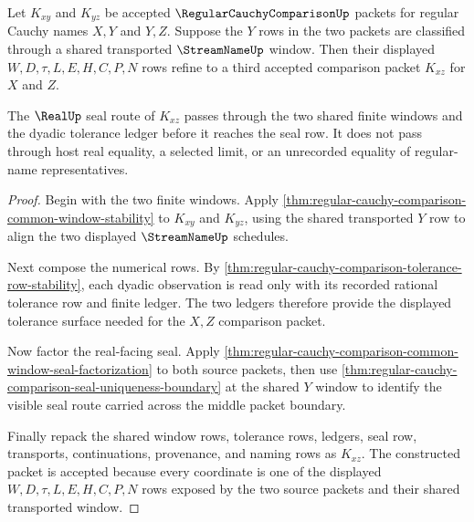 \begin{theorem}
\label{thm:regular-cauchy-comparison-three-window-triangle}
Let $K_{xy}$ and $K_{yz}$ be accepted $\RegularCauchyComparisonUp$ packets for regular Cauchy names $X,Y$ and $Y,Z$. Suppose the $Y$ rows in the two packets are classified through a shared transported $\StreamNameUp$ window. Then their displayed $W,D,\tau,L,E,H,C,P,N$ rows refine to a third accepted comparison packet $K_{xz}$ for $X$ and $Z$.

The $\RealUp$ seal route of $K_{xz}$ passes through the two shared finite windows and the dyadic tolerance ledger before it reaches the seal row. It does not pass through host real equality, a selected limit, or an unrecorded equality of regular-name representatives.
\end{theorem}
\begin{proof}
Begin with the two finite windows. Apply \autoref{thm:regular-cauchy-comparison-common-window-stability} to $K_{xy}$ and $K_{yz}$, using the shared transported $Y$ row to align the two displayed $\StreamNameUp$ schedules.

Next compose the numerical rows. By \autoref{thm:regular-cauchy-comparison-tolerance-row-stability}, each dyadic observation is read only with its recorded rational tolerance row and finite ledger. The two ledgers therefore provide the displayed tolerance surface needed for the $X,Z$ comparison packet.

Now factor the real-facing seal. Apply \autoref{thm:regular-cauchy-comparison-common-window-seal-factorization} to both source packets, then use \autoref{thm:regular-cauchy-comparison-seal-uniqueness-boundary} at the shared $Y$ window to identify the visible seal route carried across the middle packet boundary.

Finally repack the shared window rows, tolerance rows, ledgers, seal row, transports, continuations, provenance, and naming rows as $K_{xz}$. The constructed packet is accepted because every coordinate is one of the displayed $W,D,\tau,L,E,H,C,P,N$ rows exposed by the two source packets and their shared transported window.
\end{proof}


